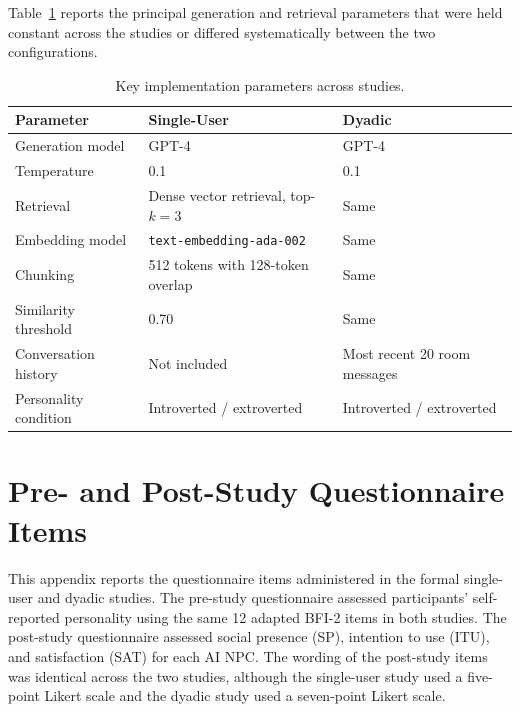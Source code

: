 \documentclass[a4paper,fleqn]{cas-sc}
\begin{document}
Table~\ref{tab:app-implementation} reports the principal generation and retrieval parameters that were held constant across the studies or differed systematically between the two configurations.

\begin{table}[htbp]
\centering
\footnotesize
\caption{Key implementation parameters across studies.}
\label{tab:app-implementation}
\begin{tabular}{p{}p{}p{}}
\toprule
\textbf{Parameter} &
\textbf{Single-User} &
\textbf{Dyadic} \\
\midrule

Generation model &
GPT-4 &
GPT-4 \\

Temperature &
0.1 &
0.1 \\

Retrieval &
Dense vector retrieval, top-$k=3$ &
Same \\

Embedding model &
\texttt{text-embedding-ada-002} &
Same \\

Chunking &
512 tokens with 128-token overlap &
Same \\

Similarity threshold &
0.70 &
Same \\

Conversation history &
Not included &
Most recent 20 room messages \\

Personality condition &
Introverted / extroverted &
Introverted / extroverted \\

\bottomrule
\end{tabular}
\end{table}

\section{Pre- and Post-Study Questionnaire Items}
\label{app:questionnaire}

This appendix reports the questionnaire items administered in the formal single-user and dyadic studies. 
The pre-study questionnaire assessed participants' self-reported personality using the same 12 adapted BFI-2 items in both studies. 
The post-study questionnaire assessed social presence (SP), intention to use (ITU), and satisfaction (SAT) for each AI NPC. 
The wording of the post-study items was identical across the two studies, although the single-user study used a five-point Likert scale and the dyadic study used a seven-point Likert scale.
\end{document}
